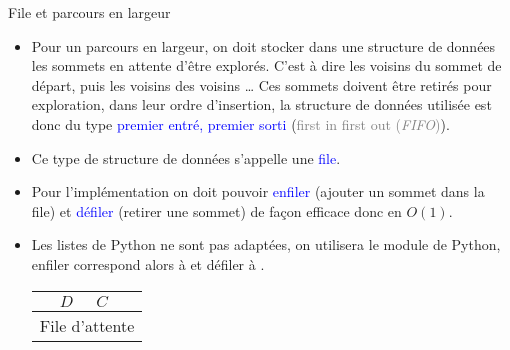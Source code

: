 \documentclass[10pt]{beamer}
\begin{document}
\begin{frame}[fragile]{\Ctitle}{\stitle}
	\begin{block}{File et parcours en largeur}
		\begin{itemize}
			\item<1-> Pour un parcours en largeur, on doit stocker dans une structure de données les sommets en attente d'être explorés. C'est à dire les voisins du sommet de départ, puis les voisins des voisins \dots 
			Ces sommets doivent être retirés pour exploration, dans leur ordre d'insertion, la structure de données utilisée est donc du type \textcolor{blue}{premier entré, premier sorti} (\textcolor{gray}{first in first out (\textit{FIFO})}).
			\item<2-> Ce type de structure de données s'appelle une \textcolor{blue}{file}.
			\item<3-> Pour l'implémentation on doit pouvoir \textcolor{blue}{enfiler} (ajouter un sommet dans la file) et \textcolor{blue}{défiler} (retirer une sommet) de façon efficace donc en $O(1)$. 
			\item<4-> Les listes de Python ne sont pas adaptées, on utilisera le module  de Python, enfiler correspond alors à  et défiler à .\vspace{0.4cm} \\
			  \hspace{2cm}
			\begin{tabular}{|p{0.5cm}|p{0.5cm}|p{0.5cm}|p{0.5cm}|}
				\hline
				\rnode{in}{$E$} & {$D$} & {$C$} & \rnode{out}{$B$} \\
				\hline
				\multicolumn{4}{c}{File d'attente} \\
			\end{tabular}
			\hspace{2cm} \onslide<9->{\rnode{def}{\framebox[1cm]{$B$}}}
		\end{itemize}
	\end{block}
\end{frame}
\end{document}

